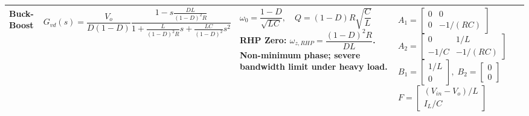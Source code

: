 \begin{center}
\begin{tabularx}{\textwidth}{@{} l >{\raggedright\arraybackslash}p{5.4cm} >{\raggedright\arraybackslash}p{4.0cm} >{\raggedright\arraybackslash}X @{}}
\textbf{Buck-Boost} &
$G_{vd}(s) = \dfrac{V_o}{D(1-D)} \dfrac{1 - s \frac{D L}{(1-D)^2 R}}{1 + \frac{L}{(1-D)^2 R} s + \frac{LC}{(1-D)^2} s^2}$ &
$\omega_0 = \dfrac{1-D}{\sqrt{LC}}, \quad Q = (1-D) R \sqrt{\dfrac{C}{L}}$ \newline
\textbf{RHP Zero:} $\omega_{z,RHP} = \dfrac{(1-D)^2 R}{D L}$. \newline
Non-minimum phase; severe bandwidth limit under heavy load. &
$A_1 = \begin{bmatrix} 0 & 0 \\ 0 & -1/(RC) \end{bmatrix}$ \newline
$A_2 = \begin{bmatrix} 0 & 1/L \\ -1/C & -1/(RC) \end{bmatrix}$ \newline
$B_1 = \begin{bmatrix} 1/L \\ 0 \end{bmatrix}, \; B_2 = \begin{bmatrix} 0 \\ 0 \end{bmatrix}$ \newline
$F = \begin{bmatrix} (V_{in} - V_o)/L \\ I_L/C \end{bmatrix}$ \\
\bottomrule
\end{tabularx}
\vspace{-4pt}
\end{center}

